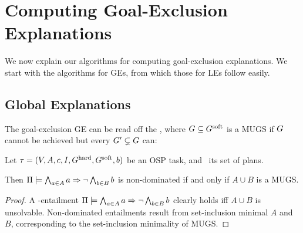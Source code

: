 \section{Computing Goal-Exclusion Explanations}
\label{algorithms}


We now explain our algorithms for computing goal-exclusion
explanations. We start with the algorithms for GEs, from which those
for LEs follow easily.




\subsection{Global Explanations}
\label{algorithms:ge}

The goal-exclusion GE can be read off the , where $G \subseteq G^{\text{\textup{soft}}}$ is a MUGS
if $G$ cannot be achieved but every $G' \subsetneq G$
can:

\begin{proposition}
\label{pro:ge-from-mugs}
Let $\tau =
(V,\allowbreak A,\allowbreak{\ensuremath{c}},\allowbreak I,\allowbreak G^{\text{\textup{hard}}},\allowbreak G^{\text{\textup{soft}}},\allowbreak{\ensuremath{b}})$
be an OSP task, and \plans\ its set of plans.

Then $\Pi \models \bigwedge_{a \in A} a \Rightarrow \neg \bigwedge_{b \in B}
  b$ is non-dominated if and only if $A \cup B$ is a MUGS.
\end{proposition}

\begin{proof}
A \plans-entailment $\Pi \models \bigwedge_{a \in A} a \Rightarrow \neg
  \bigwedge_{b \in B} b$ clearly holds iff $A \cup B$ is
unsolvable. Non-dominated entailments result from set-inclusion
minimal $A$ and $B$, corresponding to the set-inclusion minimality of
MUGS.
\end{proof}

